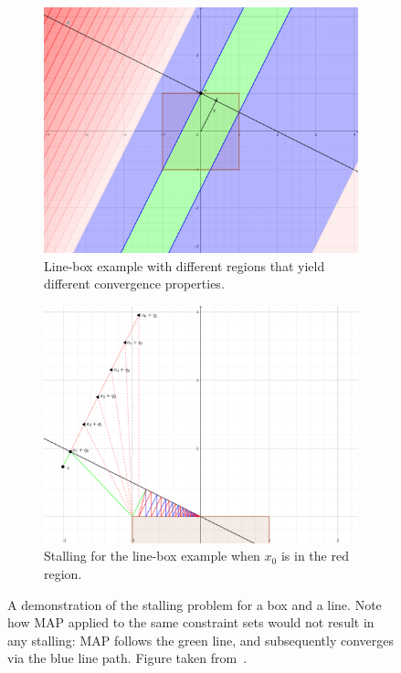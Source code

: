 \documentclass[hidelinks]{article}
\begin{document}
\begin{figure}[h]
    \centering
    \begin{subfigure}[t]{0.49\textwidth}
        \centering
        \includegraphics[width=1\textwidth]{StallingRegionsHand.png}
        \caption{Line-box example with different regions that yield different convergence properties.}
        \label{fig:region}
    \end{subfigure}
    \hfill
    \begin{subfigure}[t]{0.49\textwidth}
        \centering
        \includegraphics[width=1\textwidth]{DifferentSequences.png}
        \caption{Stalling for the line-box example when $x_0$ is in the red region.}
        \label{fig:stalling}
    \end{subfigure}
    \caption{A demonstration of the stalling problem for a box and a line. Note how MAP applied to the same constraint sets would not result in any stalling: MAP follows the green line, and subsequently converges via the blue line path. Figure taken from~\cite{DYKSTRASTALLING}.}
    \label{fig:baushkeStall}
\end{figure}
\end{document}
